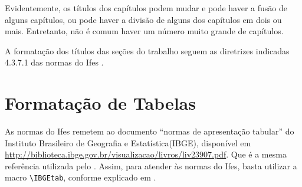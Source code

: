 \documentclass[times,english,brazilian,oneside,section=TITLE]{ifes8}
\begin{document}
Evidentemente, os títulos dos capítulos podem mudar e pode haver a
fusão de alguns capítulos, ou pode haver a divisão de alguns dos
capítulos em dois ou mais. Entretanto, não é comum haver um número
muito grande de capítulos.

A formatação dos títulos das seções do trabalho seguem as diretrizes
indicadas 4.3.7.1 das normas do Ifes \cite[p.~34]{Ifes2024}.



\section{Formatação de Tabelas}
\label{sec:format-tabelas}

As normas do Ifes remetem ao documento ``normas de apresentação
tabular'' do Instituto Brasileiro de Geografia e Estatística(IBGE),
disponível em
\url{http://biblioteca.ibge.gov.br/visualizacao/livros/liv23907.pdf}.
Que é a mesma referência utilizada pelo \abnTeX. Assim, para atender
às normas do Ifes, basta utilizar a macro \verb!\IBGEtab!, conforme
explicado em \cite[p.~41]{Araujo2016}.
\end{document}
